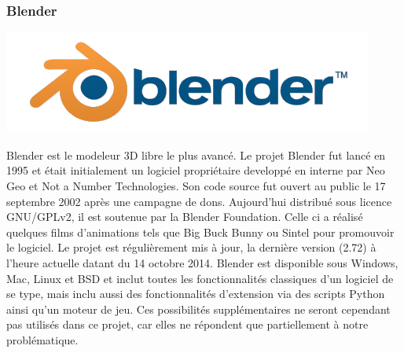 	\subsubsection{Blender}
		\noindent\begin{minipage}{0.2\textwidth}
			\includegraphics[width=\linewidth]{1-PreEtude/img/blender_logo}
			\end{minipage}
			\hfill
			\begin{minipage}{0.8\textwidth}
			Blender\cite{blender} est le modeleur 3D libre le plus avancé. Le projet Blender fut lancé en 1995 et était initialement un logiciel propriétaire developpé en interne par Neo Geo et Not a Number Technologies.
			Son code source fut ouvert au public le 17 septembre 2002 après une campagne de dons. Aujourd'hui distribué sous licence GNU/GPLv2, il est soutenue par la Blender Foundation. Celle ci a réalisé quelques films d'animations tels que Big Buck Bunny ou Sintel pour promouvoir le logiciel.
			Le projet est régulièrement mis à jour, la dernière version (2.72) à l'heure actuelle datant du 14 octobre 2014.
			Blender est disponible sous Windows, Mac, Linux et BSD et inclut toutes les fonctionnalités classiques d'un logiciel de se type, mais inclu aussi des fonctionnalités d'extension via des scripts Python ainsi qu'un moteur de jeu.
			Ces possibilités supplémentaires ne seront cependant pas utilisés dans ce projet, car elles ne répondent que partiellement à notre problématique.
		\end{minipage}


